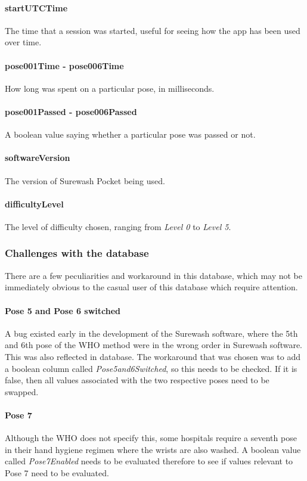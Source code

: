             \paragraph{startUTCTime} The time that a session was started, useful for seeing how the app has been used over time.
            \paragraph{pose001Time - pose006Time} How long was spent on a particular pose, in milliseconds.
            \paragraph{pose001Passed - pose006Passed} A boolean value saying whether a particular pose was passed or not.
            \paragraph{softwareVersion} The version of Surewash Pocket being used.
            \paragraph{difficultyLevel} The level of difficulty chosen, ranging from {\slshape Level 0} to {\slshape Level 5}.
        \subsubsection{Challenges with the database} There are a few peculiarities and workaround in this database, which may not be immediately obvious to the casual user of this database which require attention.
            \paragraph{Pose 5 and Pose 6 switched} A bug existed early in the development of the Surewash software, where the 5th and 6th pose of the WHO method were in the wrong order in Surewash software. This was also reflected in database. The workaround that was chosen was to add a boolean column called {\slshape Pose5and6Switched}, so this needs to be checked. If it is false, then all values associated with the two respective poses need to be swapped.
            \paragraph{Pose 7} Although the WHO does not specify this, some hospitals require a seventh pose in their hand hygiene regimen where the wrists are also washed. A boolean value called {\slshape Pose7Enabled} needs to be evaluated therefore to see if values relevant to Pose 7 need to be evaluated.

